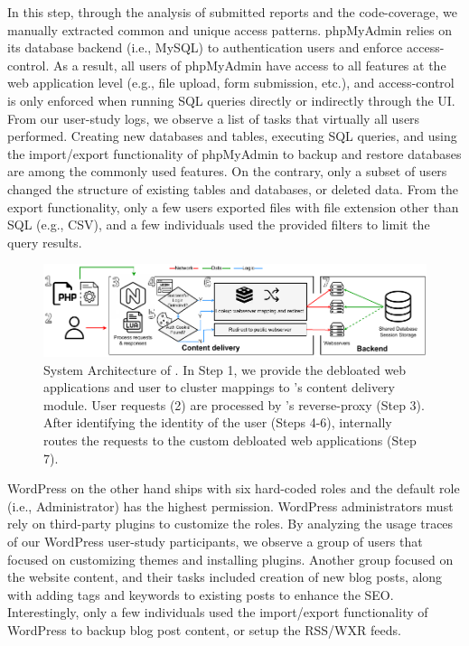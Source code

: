 In this step, through the analysis of submitted reports and the code-coverage, we manually extracted common and unique access patterns. 
phpMyAdmin relies on its database backend (i.e., MySQL) to authentication users and enforce access-control. 
As a result, all users of phpMyAdmin have access to all features at the web application level (e.g., file upload, form submission, etc.), and access-control is only enforced when running SQL queries directly or indirectly through the UI. 
From our user-study logs, we observe a list of tasks that virtually all users performed. 
Creating new databases and tables, executing SQL queries, and using the import/export functionality of phpMyAdmin to backup and restore databases are among the commonly used features. 
On the contrary, only a subset of users changed the structure of existing tables and databases, or deleted data. 
From the export functionality, only a few users exported files with file extension other than SQL (e.g., CSV), and a few individuals used the provided filters to limit the query results. 

\begin{figure}[t]
    \centering
    \includegraphics[width=\linewidth]{figures/dbltr/RoleModelsFlow.pdf}
    \caption{System Architecture of \dbltr{}. In Step 1, we provide the debloated web applications and user to cluster mappings to \dbltr{}'s content delivery module. User requests (2) are processed by \dbltr{}'s reverse-proxy (Step 3). After identifying the identity of the user (Steps 4-6), \dbltr{} internally routes the requests to the custom debloated web applications (Step 7).}
	\label{fig:system_architecture}
\end{figure}

WordPress on the other hand ships with six hard-coded roles and the default role (i.e., Administrator) has the highest permission. 
WordPress administrators must rely on third-party plugins to customize the roles. 
By analyzing the usage traces of our WordPress user-study participants, we observe a group of users that focused on customizing themes and installing plugins. 
Another group focused on the website content, and their tasks included creation of new blog posts, along with adding tags and keywords to existing posts to enhance the SEO. 
Interestingly, only a few individuals used the import/export functionality of WordPress to backup blog post content, or setup the RSS/WXR feeds. 

